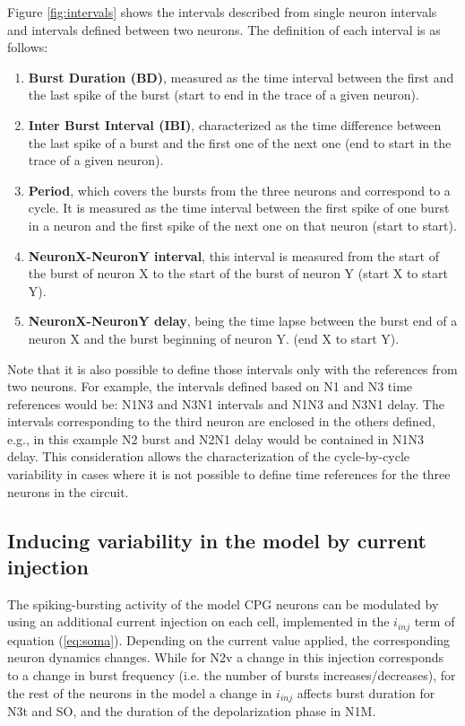 Figure \ref{fig:intervals} shows the intervals described from single neuron intervals and intervals defined between two neurons. The definition of each interval is as follows:
\begin{enumerate}
	\item \textbf{Burst Duration (BD)}, measured as the time interval between the first and the last spike of the burst (start to end in the trace of a given neuron).
	\item \textbf{Inter Burst Interval (IBI)}, characterized as the time difference between the last spike of a burst and the first one of the next one (end to start in the trace of a given neuron).
	\item \textbf{Period}, which covers the bursts from the three neurons and correspond to a cycle. It is measured as the time interval between the first spike of one burst in a neuron and the first spike of the next one on that neuron (start to start).
	\item \textbf{NeuronX-NeuronY interval}, this interval is measured from the start of the burst of neuron X to the start of the burst of neuron Y (start X to start Y).
	\item \textbf{NeuronX-NeuronY delay}, being the time lapse between the burst end of a neuron X and the burst beginning of neuron Y. (end X to start Y).
\end{enumerate}

Note that it is also possible to define those intervals only with the references from two neurons. For example, the intervals defined based on N1 and N3 time references would be: N1N3 and N3N1 intervals and N1N3 and N3N1 delay. The intervals corresponding to the third neuron are enclosed in the others defined, e.g., in this example N2 burst and N2N1 delay would be contained in N1N3 delay. This consideration allows the characterization of the cycle-by-cycle variability in cases where it is not possible to define time references for the three neurons in the circuit. 

\subsection{Inducing variability in the model by current injection}
\label{subsec:inj protocol}
The spiking-bursting activity of the model CPG neurons can be modulated by using an additional current injection on each cell, implemented in the \(i_{inj}\) term of equation (\ref{eq:soma}). Depending on the current value applied, the corresponding neuron dynamics changes. While for N2v a change in this injection corresponds to a change in burst frequency (i.e. the number of bursts increases/decreases), for the rest of the neurons in the model a change in \(i_{inj}\) affects burst duration for N3t and SO, and the duration of the depolarization phase in N1M.


